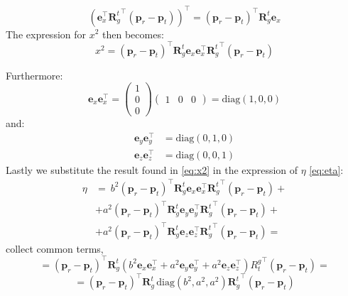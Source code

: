 \[
(\mathbf{e}_x^\top {\mathbf{R}_g^t}^\top (\mathbf{p}_r - \mathbf{p}_t))^\top = (\mathbf{p}_r - \mathbf{p}_t)^\top {\mathbf{R}_g^t} \mathbf{e}_x
\]
The expression for $x^2$ then becomes:
\begin{equation}
    x^2 = \left(\mathbf{p}_r - \mathbf{p}_t\right)^\top {\mathbf{R}_g^t} \mathbf{e}_x \mathbf{e}_x^\top {\mathbf{R}_g^t}^\top \left(\mathbf{p}_r - \mathbf{p}_t\right)
    \label{eq:x2}
\end{equation}

Furthermore:
\[
\mathbf{e}_x \mathbf{e}_x^\top =\begin{pmatrix}
1 \\
0 \\
0
\end{pmatrix}
\begin{pmatrix}
1 & 0 & 0
\end{pmatrix}
 = \text{diag}(1,0,0)
\]
and:
\[
\begin{aligned}
    \mathbf{e}_y \mathbf{e}_y^\top &= \text{diag}(0,1,0) \\
    \mathbf{e}_z \mathbf{e}_z^\top &= \text{diag}(0,0,1)
\end{aligned}
\]
Lastly we substitute the result found in \ref{eq:x2} in the expression of $\eta$ \ref{eq:eta}:
\[
\begin{aligned}
    \eta &=  \ b^2 \left(\mathbf{p}_r - \mathbf{p}_t\right)^\top \mathbf{R}_g^t \mathbf{e}_x \mathbf{e}_x^\top {\mathbf{R}_g^t}^\top \left(\mathbf{p}_r - \mathbf{p}_t\right) + \\
    &+ a^2 \left(\mathbf{p}_r - \mathbf{p}_t\right)^\top \mathbf{R}_g^t \mathbf{e}_y \mathbf{e}_y^\top {\mathbf{R}_g^t}^\top \left(\mathbf{p}_r - \mathbf{p}_t\right) +\\
    &+ a^2 \left(\mathbf{p}_r - \mathbf{p}_t\right)^\top \mathbf{R}_g^t \mathbf{e}_z \mathbf{e}_z^\top {\mathbf{R}_g^t}^\top \left(\mathbf{p}_r - \mathbf{p}_t\right) =
\end{aligned}
\]
collect common terms,
\[
= \left(\mathbf{p}_r - \mathbf{p}_t\right)^\top \mathbf{R}_g^t \left( b^2 \mathbf{e}_x \mathbf{e}_x^\top + a^2 \mathbf{e}_y \mathbf{e}_y^\top + a^2 \mathbf{e}_z \mathbf{e}_z^\top \right) {R_t^g}^\top \left(\mathbf{p}_r - \mathbf{p}_t\right)=
\]
\begin{equation}
    = \left(\mathbf{p}_r - \mathbf{p}_t\right)^\top \mathbf{R}_g^t \, \text{diag}(b^2, a^2, a^2) {\mathbf{R}_g^t}^\top \left(\mathbf{p}_r - \mathbf{p}_t\right)
    \label{eq:eta2}
\end{equation}

